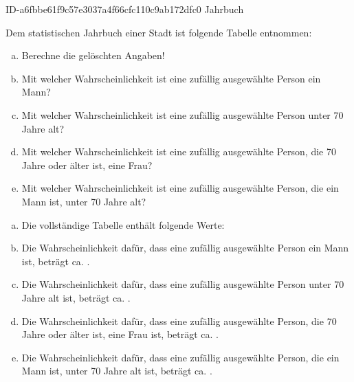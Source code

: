 \begin{exercise}
      {ID-a6fbbe61f9c57e3037a4f66cfc110c9ab172dfc0}
      {Jahrbuch}
  \ifproblem\problem\par
    Dem statistischen Jahrbuch einer Stadt ist folgende Tabelle entnommen:
    \begin{center}
      \begin{fourfoldtable}
      \end{fourfoldtable}
    \end{center}
    \begin{enumerate}[a)]
      \item Berechne die gelöschten Angaben!
      \item Mit welcher Wahrscheinlichkeit ist eine zufällig ausgewählte
            Person ein Mann?
      \item Mit welcher Wahrscheinlichkeit ist eine zufällig ausgewählte
            Person unter 70 Jahre alt?
      \item Mit welcher Wahrscheinlichkeit ist eine zufällig ausgewählte
            Person, die 70 Jahre oder älter ist, eine Frau?
      \item Mit welcher Wahrscheinlichkeit ist eine zufällig ausgewählte
            Person, die ein Mann ist, unter 70 Jahre alt?
    \end{enumerate}
  \fi
  \ifoutcome\outcome\par
    \begin{enumerate}[a)]
      \item Die vollständige Tabelle enthält folgende Werte:
            \begin{center}
              \begin{fourfoldtable}
              \end{fourfoldtable}
            \end{center}
      \item Die Wahrscheinlichkeit dafür, dass eine zufällig ausgewählte
            Person ein Mann ist, beträgt ca. .
      \item Die Wahrscheinlichkeit dafür, dass eine zufällig ausgewählte
            Person unter 70 Jahre alt ist, beträgt ca. .
      \item Die Wahrscheinlichkeit dafür, dass eine zufällig ausgewählte
            Person, die 70 Jahre oder älter ist, eine Frau ist, beträgt
            ca. .
      \item Die Wahrscheinlichkeit dafür, dass eine zufällig ausgewählte
            Person, die ein Mann ist, unter 70 Jahre alt ist, beträgt
            ca. .
    \end{enumerate}
  \fi
\end{exercise}
